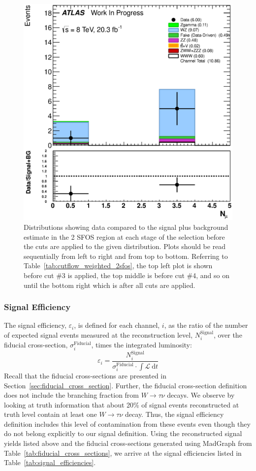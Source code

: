 \begin{figure}[ht!]
\includegraphics[width=0.3\columnwidth]{figures/appendix_signal_selection/PreselectionJune2_NoSTVF_2SFOS_ChargeAbs1_BVeto85_ZVeto20GeV_METGt55GeV_DeltaPhi2p5_NJetLt2_physics/weight_all/eps/NMuons_histratio.eps}
\caption{Distributions showing data compared to the signal plus background estimate in the 2 SFOS region at each stage 
of the selection before the cuts are applied to the given distribution. Plots should be read sequentially from left to right
and from top to bottom. 
Referring to Table~\ref{tab:cutflow_weighted_2sfos}, the top left
plot is shown before cut \#3 is applied, the top middle is before cut \#4, and
so on until the bottom right which is after all cuts are applied.}
\label{fig:2sfos}
\end{figure}



%

\subsubsection{Signal Efficiency }
\label{sec:signal_efficiency}

The signal efficiency, $\varepsilon_i$, is defined for each channel, $i$,
as the ratio of the number of expected signal events measured
at the reconstruction level, $N_i^{\textrm{Signal}}$, over the fiducial cross-section, $\sigma^{\textrm{Fiducial}}_i$, times the integrated luminosity:
\begin{equation}
\varepsilon_i = \frac{N_i^{\textrm{Signal}}}{\sigma^{\textrm{Fiducial}}_i\cdot\int\mathscr{L}~\textrm{d}t}
\end{equation}
Recall that the fiducial cross-sections are presented in Section~\ref{sec:fiducial_cross_section}. Further, the fiducial cross-section definition
does not include the branching fraction from $W\rightarrow\tau\nu$ decays.
We observe by looking at truth information that about 20\% of signal
events reconstructed at truth level contain at
least one $W\rightarrow\tau\nu$ decay. Thus, the signal efficiency
definition includes this level of contamination from these events
even though they do not belong explicitly to our signal definition.
Using the reconstructed signal yields listed above and the fiducial
cross-sections generated using MadGraph
from Table~\ref{tab:fiducial_cross_sections}, we
arrive at the signal efficiencies listed in Table~\ref{tab:signal_efficiencies}.


